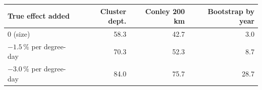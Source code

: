 \begin{tabular}{lrrr}
\toprule
True effect added & Cluster dept. & Conley 200 km & Bootstrap by year \\
\midrule
0 (size) & 58.3 & 42.7 & 3.0 \\
$-1.5\,\%$ per degree-day & 70.3 & 52.3 & 8.7 \\
$-3.0\,\%$ per degree-day & 84.0 & 75.7 & 28.7 \\
\bottomrule
\end{tabular}
